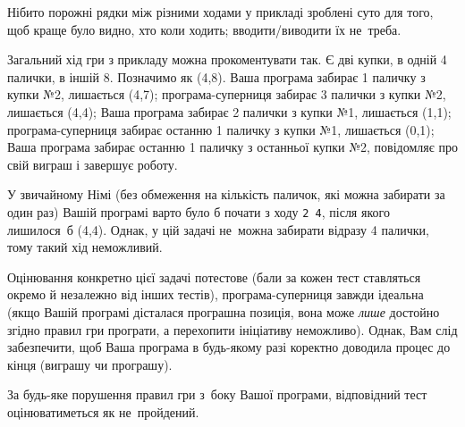 \Note

Нібито порожні рядки між різними ходами у прикладі зроблені суто для того, щоб краще було видно, хто коли ходить; вводити/виводити їх не~треба.

Загальний хід гри з прикладу можна прокоментувати так. 
Є дві купки, в одній 4 палички, в іншій 8. Позначимо як (4,8).
Ваша програма забирає 1 паличку з купки №2, лишається (4,7);
програма-суперниця забирає 3 палички з купки №2, лишається (4,4);
Ваша програма забирає 2 палички з купки №1, лишається (1,1);
програма-суперниця забирає останню 1 паличку з купки №1, лишається (0,1);
Ваша програма забирає останню 1 паличку з останньої купки №2, повідомляє про свій виграш і завершує роботу.

У звичайному Німі (без обмеження на кількість паличок, які можна забирати за один раз) Вашій програмі варто було б почати з ходу {\tt 2 4}, після якого лишилося~б (4,4). Однак, у цій задачі не~можна забирати відразу 4 палички, тому такий хід неможливий.


\Scoring
Оцінювання конкретно цієї задачі потестове (бали за кожен тест ставляться окремо й незалежно від інших тестів), програма-суперниця завжди ідеальна (якщо Вашій програмі дісталася програшна позиція, вона може {\it лише} достойно згідно правил гри програти, а перехопити ініціативу неможливо). Однак, Вам слід забезпечити, щоб Ваша програма в будь-якому разі коректно доводила процес до кінця (виграшу чи програшу). 

За будь-яке порушення правил гри з~боку Вашої програми, відповідний тест оцінюватиметься як не~пройдений.

